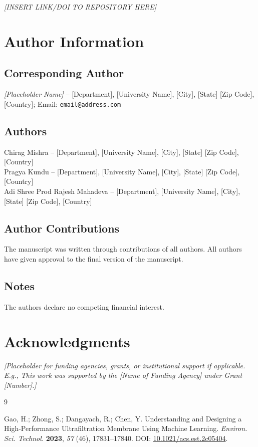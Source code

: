 \documentclass[11pt]{article}
\begin{document}
\textit{[INSERT LINK/DOI TO REPOSITORY HERE]}

\section*{Author Information}

\subsection*{Corresponding Author}
\textit{[Placeholder Name]} -- [Department], [University Name], [City], [State] [Zip Code], [Country]; Email: \texttt{email@address.com}

\subsection*{Authors}
Chirag Mishra -- [Department], [University Name], [City], [State] [Zip Code], [Country] \\
Pragya Kundu -- [Department], [University Name], [City], [State] [Zip Code], [Country] \\
Adi Shree Prod Rajesh Mahadeva -- [Department], [University Name], [City], [State] [Zip Code], [Country]

\subsection*{Author Contributions}
The manuscript was written through contributions of all authors. All authors have given approval to the final version of the manuscript.

\subsection*{Notes}
The authors declare no competing financial interest.

\section*{Acknowledgments}

\textit{[Placeholder for funding agencies, grants, or institutional support if applicable. E.g., This work was supported by the [Name of Funding Agency] under Grant [Number].]}

\begin{thebibliography}{9}

Gao, H.; Zhong, S.; Dangayach, R.; Chen, Y.
Understanding and Designing a High-Performance Ultrafiltration Membrane Using Machine Learning.
\textit{Environ. Sci. Technol.} \textbf{2023}, \textit{57} (46), 17831--17840.
DOI: \href{https://doi.org/10.1021/acs.est.2c05404}{10.1021/acs.est.2c05404}.

\end{thebibliography}
\end{document}
